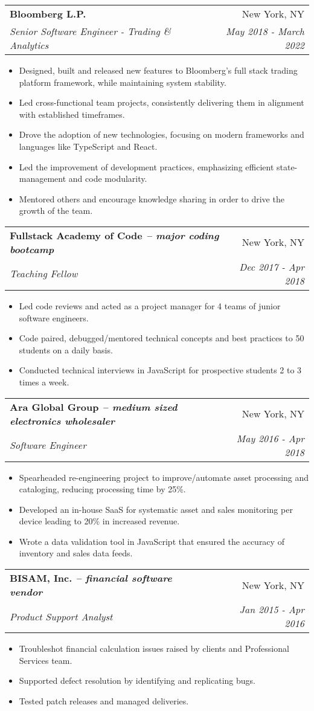 \documentclass[letterpaper,10pt]{article}
\makeatletter
\newcommand{\resumeItemSimple}[1]{
  \item\small{
    {#1}{\vspace{-2pt}}
  }
}
\newcommand{\resumeSubheading}[4]{
  \vspace{-1pt}\item
    \begin{tabular*}{0.97\textwidth}{l@{\extracolsep{\fill}}r}
      \textbf{#1} & #2 \\
      \textit{\small#3} & \textit{\small #4} \\
    \end{tabular*}\vspace{-5pt}
}
\newcommand{\resumeItemListStart}{\begin{itemize}}
\newcommand{\resumeItemListEnd}{\end{itemize}\vspace{-5pt}}
\newcommand{\engineerType}{Software Engineer}
\makeatother
\begin{document}
    \resumeSubheading
      {Bloomberg L.P.}{New York, NY}
      {Senior Software Engineer - Trading \& Analytics}{May 2018 - March 2022}
      \resumeItemListStart
        \resumeItemSimple{Designed, built and released new features to Bloomberg's full stack trading platform framework, while maintaining system stability.}
        \resumeItemSimple{Led cross-functional team projects, consistently delivering them in alignment with established timeframes.}
        \resumeItemSimple{Drove the adoption of new technologies, focusing on modern frameworks and languages like TypeScript and React.}
        \resumeItemSimple{Led the improvement of development practices, emphasizing efficient state-management and code modularity.}
        \resumeItemSimple{Mentored others and encourage knowledge sharing in order to drive the growth of the team.}
      \resumeItemListEnd

    \resumeSubheading
      {Fullstack Academy of Code \normalfont\textit{-- major coding bootcamp}}{New York, NY}
      {Teaching Fellow}{Dec 2017 - Apr 2018}
      \resumeItemListStart
        \resumeItemSimple{Led code reviews and acted as a project manager for 4 teams of junior software engineers.}
        \resumeItemSimple{Code paired, debugged/mentored technical concepts and best practices to 50 students on a daily basis.}
        \resumeItemSimple{Conducted technical interviews in JavaScript for prospective students 2 to 3 times a week.}
      \resumeItemListEnd

    \resumeSubheading
      {Ara Global Group \normalfont\textit{-- medium sized electronics wholesaler}}{New York, NY}
      {\engineerType{}}{May 2016 - Apr 2018}
      \resumeItemListStart
      	\resumeItemSimple{Spearheaded re-engineering project to improve/automate asset processing and  cataloging, reducing processing time by 25\%.}
        \resumeItemSimple{Developed an in-house SaaS for systematic asset and sales monitoring per device leading to 20\% in increased revenue.}
        \resumeItemSimple{Wrote a data validation tool in JavaScript that ensured the accuracy of inventory and sales data feeds.}
      \resumeItemListEnd

    \resumeSubheading
      {BISAM, Inc. \normalfont\textit{-- financial software vendor}}{New York, NY}
      {Product Support Analyst}{Jan 2015 - Apr 2016}
      \resumeItemListStart
        \resumeItemSimple{Troubleshot financial calculation issues raised by clients and Professional Services team.}
        \resumeItemSimple{Supported defect resolution by identifying and replicating bugs.}
        \resumeItemSimple{Tested patch releases and managed deliveries.}
      \resumeItemListEnd
\end{document}
